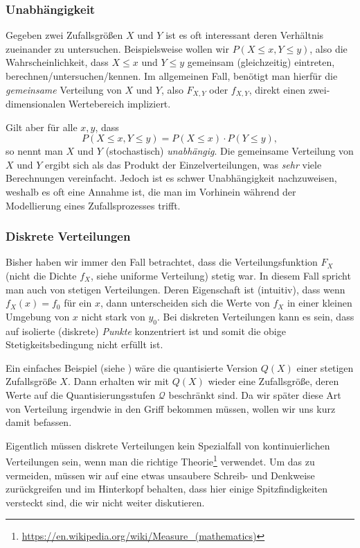 \subsubsection{Unabhängigkeit}\label{sec:random:unabh}
%
%
Gegeben zwei Zufallsgrößen $X$ und $Y$ ist es oft interessant deren Verhältnis zueinander zu untersuchen. 
Beispielsweise wollen wir $P(X \leqslant x, Y \leqslant y)$, also die Wahrscheinlichkeit, dass $X \leqslant x$ und $Y \leqslant y$ gemeinsam (gleichzeitig) eintreten, berechnen/untersuchen/kennen.
Im allgemeinen Fall, benötigt man hierfür die \emph{gemeinsame} Verteilung von $X$ und $Y$, also $F_{X,Y}$ oder $f_{X,Y}$, direkt einen zwei-dimensionalen Wertebereich impliziert.

Gilt aber für alle $x,y$, dass
\begin{equation}\label{eq:random:unabh}
    P(X \leqslant x, Y \leqslant y) = P(X \leqslant x) \cdot P(Y \leqslant y),
\end{equation}
so nennt man $X$ und $Y$ (stochastisch) \emph{unabhängig}. 
Die gemeinsame Verteilung von $X$ und $Y$ ergibt sich als das Produkt der Einzelverteilungen, was \emph{sehr} viele Berechnungen vereinfacht.
Jedoch ist es schwer Unabhängigkeit nachzuweisen, weshalb es oft eine Annahme ist, die man im Vorhinein während der Modellierung eines Zufallsprozesses trifft.
%
%
\subsubsection{Diskrete Verteilungen}
%
Bisher haben wir immer den Fall betrachtet, dass die Verteilungsfunktion $F_X$ (nicht die Dichte $f_X$, siehe uniforme Verteilung) stetig war.
In diesem Fall spricht man auch von stetigen Verteilungen.
Deren Eigenschaft ist (intuitiv), dass wenn $f_X(x) = f_0$ für ein $x$, dann unterscheiden sich die Werte von $f_X$ in einer kleinen Umgebung von $x$ nicht stark von $y_0$.
Bei diskreten Verteilungen kann es sein, dass  auf isolierte (diskrete) \emph{Punkte} konzentriert ist und somit die obige Stetigkeitsbedingung nicht erfüllt ist.

Ein einfaches Beispiel (siehe ) wäre die quantisierte Version $Q(X)$ einer stetigen Zufallsgröße $X$. 
Dann erhalten wir mit $Q(X)$ wieder eine Zufallsgröße, deren Werte auf die Quantisierungsstufen $\mathcal{Q}$ beschränkt sind.
Da wir später diese Art von Verteilung irgendwie in den Griff bekommen müssen, wollen wir uns kurz damit befassen.

Eigentlich müssen diskrete Verteilungen kein Spezialfall von kontinuierlichen Verteilungen sein, wenn man die richtige Theorie\footnote{\url{https://en.wikipedia.org/wiki/Measure_(mathematics)}} verwendet.
Um das zu vermeiden, müssen wir auf eine etwas unsaubere Schreib- und Denkweise zurückgreifen und im Hinterkopf behalten, dass hier einige Spitzfindigkeiten versteckt sind, die wir nicht weiter diskutieren.

